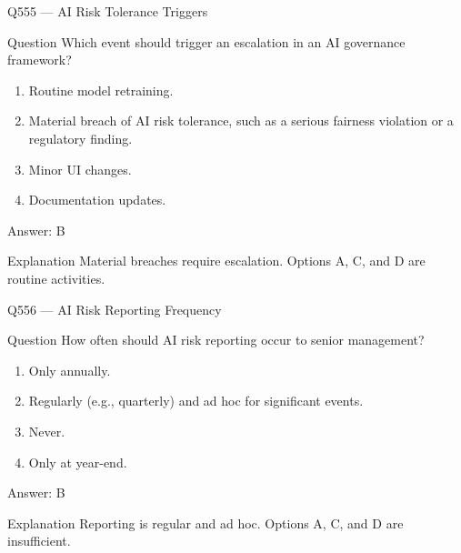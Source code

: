 \documentclass[aspectratio=169,8pt]{beamer}
\begin{document}
	\begin{frame}{Q555 --- AI Risk Tolerance Triggers}
		\begin{block}{Question}
			Which event should trigger an escalation in an AI governance framework?
			\begin{enumerate}
				\item Routine model retraining.
				\item Material breach of AI risk tolerance, such as a serious fairness violation or a regulatory finding.
				\item Minor UI changes.
				\item Documentation updates.
			\end{enumerate}
		\end{block}
		\begin{exampleblock}{Answer: B}\end{exampleblock}
		\begin{block}{Explanation}
			Material breaches require escalation. Options A, C, and D are routine activities.
		\end{block}
	\end{frame}
	
	\begin{frame}{Q556 --- AI Risk Reporting Frequency}
		\begin{block}{Question}
			How often should AI risk reporting occur to senior management?
			\begin{enumerate}
				\item Only annually.
				\item Regularly (e.g., quarterly) and ad hoc for significant events.
				\item Never.
				\item Only at year-end.
			\end{enumerate}
		\end{block}
		\begin{exampleblock}{Answer: B}\end{exampleblock}
		\begin{block}{Explanation}
			Reporting is regular and ad hoc. Options A, C, and D are insufficient.
		\end{block}
	\end{frame}
	
\end{document}
